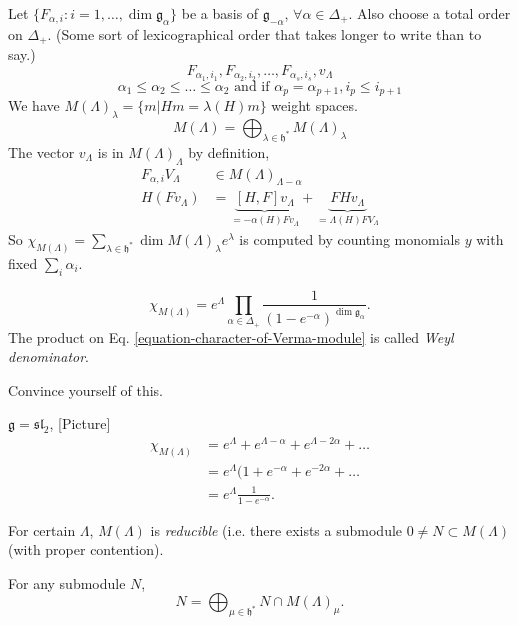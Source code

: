 Let $\{F_{\alpha,i}:i = 1,\ldots, \dim \mathfrak{g}_\alpha\}$ be a basis of
$\mathfrak{g}_{-\alpha}$, $\forall \alpha \in \Delta_+$. 
Also choose a total order on $\Delta_+$. (Some sort of lexicographical order
that takes longer to write than to say.)
$$
F_{\alpha_1,i_1},F_{\alpha_2,i_2},\ldots,F_{\alpha_s,i_s},v_\Lambda
$$
$$
\alpha_1\leq \alpha_2\leq \ldots \leq \alpha_2\text{ and if }
\alpha_p=\alpha_{p+1}, i_p \leq  i_{p+1}
$$
We have $M(\Lambda)_\lambda=\{m|Hm=\lambda(H)m\}$ weight spaces.
$$
M(\Lambda)=\bigoplus_{\lambda \in \mathfrak{h}^*}M(\Lambda)_\lambda
$$
The vector $v_{\Lambda}$ is in $M(\Lambda)_\Lambda$ by definition,
\begin{align*}
F_{\alpha,i}V_\Lambda &\in M(\Lambda)_{\Lambda-\alpha}\\
H(Fv_\Lambda)&=\underbrace{[H,F]v_\Lambda}_{=-\alpha(H)Fv_\Lambda}
+\underbrace{FHv_\Lambda}_{=\Lambda(H)FV_\Lambda}
\end{align*}
So $\chi_{M(\Lambda)}=\sum_{\lambda \in \mathfrak{h}^*}\dim M(\Lambda)_\lambda
e^{\lambda}$
is computed by counting monomials $y$ with fixed $\sum_{i}\alpha_i$.

\begin{equation}
\label{equation-character-of-Verma-module}
\chi_{M(\Lambda)}=e^{\Lambda}\prod_{\alpha \in \Delta_+}
\frac{1}{(1-e^{-\alpha})^{\dim \mathfrak{g}_\alpha}}.
\end{equation}
The product on Eq. \ref{equation-character-of-Verma-module} is called 
{\it Weyl denominator}.
\begin{exercise}
\label{exercise-convince-yourself}
Convince yourself of this.
\end{exercise}

\begin{example}
\label{example-sl2-character}
$\mathfrak{g}=\mathfrak{sl}_2$, [Picture]
\begin{align*}
\chi_{M(\Lambda)}&=e^{\Lambda}+e^{\Lambda-\alpha}+e^{\Lambda-2\alpha}+\ldots\\
&=e^{\Lambda}(1+e^{-\alpha}+e^{-2\alpha}+\ldots\\
&=e^{\Lambda}\frac{1}{1-e^{-\alpha}}.
\end{align*}
\end{example}

\medskip\noindent
For certain $\Lambda$, $M(\Lambda)$ is {\it reducible} (i.e. there exists
a submodule $0 \neq N \subset M(\Lambda)$ (with proper contention).

\begin{lemma}
\label{lemma-}
For any submodule $N$,
$$
N=\bigoplus_{\mu \in \mathfrak{h}^*}N \cap M(\Lambda)_\mu.
$$
\end{lemma}

